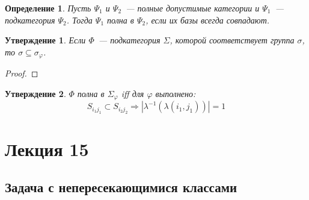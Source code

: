 \documentclass[a4paper, 12pt]{report}
\newtheorem{definition}{Определение}[chapter]
\newtheorem{St}{Утверждение}[chapter]
\begin{document}
\begin{definition}
Пусть $\Psi_1$ и $\Psi_2$~--- полные допустимые категории и $\Psi_1$~--- подкатегория $\Psi_2$. 
Тогда $\Psi_1$ \emph{полна в} $\Psi_2$, если их базы всегда совпадают. 
\end{definition}

\begin{St}
Если $\Phi$~--- подкатегория $\Sigma$, которой соответствует группа $\sigma$, то $\sigma \subseteq \sigma_{\varphi}$. 
\end{St}
\begin{proof}

\end{proof}

\begin{St}
$\Phi$ полна в $\Sigma_{\varphi}$ iff для $\varphi$ выполнено:
\[
S_{i_1 j_1} \subset S_{i_2 j_2} \Rightarrow | \lambda^{-1}(\lambda(i_1, j_1)) | = 1
\]
\end{St}

\chapter{Лекция 15}
\section{Задача с непересекающимися классами}
\end{document}
